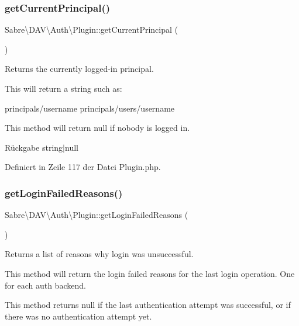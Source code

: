 \subsubsection{\texorpdfstring{get\+Current\+Principal()}{getCurrentPrincipal()}}
{\footnotesize\ttfamily Sabre\textbackslash{}\+D\+A\+V\textbackslash{}\+Auth\textbackslash{}\+Plugin\+::get\+Current\+Principal (\begin{DoxyParamCaption}{ }\end{DoxyParamCaption})}

Returns the currently logged-\/in principal.

This will return a string such as\+:

principals/username principals/users/username

This method will return null if nobody is logged in.

\begin{DoxyReturn}{Rückgabe}
string$\vert$null 
\end{DoxyReturn}


Definiert in Zeile 117 der Datei Plugin.\+php.

\mbox{\label{class_sabre_1_1_d_a_v_1_1_auth_1_1_plugin_a7517785241c5bba0a97a78cc21475038}} 
\subsubsection{\texorpdfstring{get\+Login\+Failed\+Reasons()}{getLoginFailedReasons()}}
{\footnotesize\ttfamily Sabre\textbackslash{}\+D\+A\+V\textbackslash{}\+Auth\textbackslash{}\+Plugin\+::get\+Login\+Failed\+Reasons (\begin{DoxyParamCaption}{ }\end{DoxyParamCaption})}

Returns a list of reasons why login was unsuccessful.

This method will return the login failed reasons for the last login operation. One for each auth backend.

This method returns null if the last authentication attempt was successful, or if there was no authentication attempt yet.

